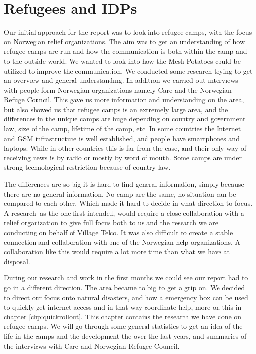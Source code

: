 \chapter{Refugees and IDPs}
\label{chp:refugeecamps} 
Our initial approach for the report was to look into refugee camps, with the focus on Norwegian relief organizations. The aim was to get an understanding of how refugee camps are run and how the communication is both within the camp and to the outside world. We wanted to look into how the Mesh Potatoes could be utilized to improve the communication. We conducted some research trying to get an overview and general understanding. In addition we carried out interviews with people form Norwegian organizations namely Care and the Norwegian Refuge Council. This gave us more information and understanding on the area, but also showed us that refugee camps is an extremely large area, and the differences in the unique camps are huge depending on country and government law, size of the camp, lifetime of the camp, etc. In some countries the Internet and GSM infrastructure is well established, and people have smartphones and laptops. While in other countries this is far from the case, and their only way of receiving news is by radio or mostly by word of mouth. Some camps are under strong technological restriction because of country law. 

The differences are so big it is hard to find general information, simply because there are no general information. No camp are the same, no situation can be compared to each other. Which made it hard to decide in what direction to focus. A research, as the one first intended, would require a close collaboration with a relief organization to give full focus both to us and the research we are conducting on behalf of Village Telco. It was also difficult to create a stable connection and collaboration with one of the Norwegian help organizations. A collaboration like this would require a lot more time than what we have at disposal. 
  
During our research and work in the first months we could see our report had to go in a different direction. The area became to big to get a grip on. We decided to direct our focus onto natural disasters, and how a emergency box can be used to quickly get internet access and in that way coordinate help, more on this in chapter \ref{chp:quickrollout}.
This chapter contains the research we have done on refugee camps. We will go through some general statistics to get an idea of the life in the camps and the development the over the last years, and summaries of the interviews with Care and Norwegian Refugee Council.

